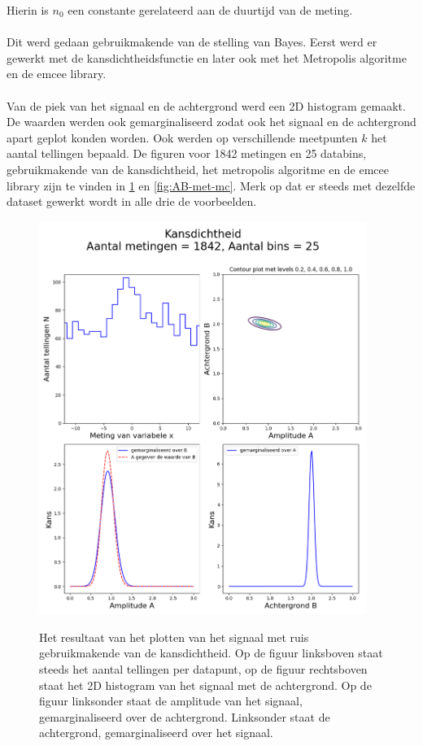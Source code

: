 Hierin is $n_{0}$ een constante gerelateerd aan de duurtijd van de meting. \\ \\
Dit werd gedaan gebruikmakende van de stelling van Bayes. Eerst werd er gewerkt met de kansdichtheidsfunctie en later ook met het Metropolis algoritme en de emcee library. \\ \\Van de piek van het signaal en de achtergrond werd een 2D histogram gemaakt. De waarden werden ook gemarginaliseerd zodat ook het signaal en de achtergrond apart geplot konden worden. Ook werden op verschillende meetpunten $k$ het aantal tellingen bepaald. De figuren voor 1842 metingen en 25 databins, gebruikmakende van de kansdichtheid, het metropolis algoritme en de emcee library zijn te vinden in \cref{fig:AB-bay} en \cref{fig:AB-met-mc}. Merk op dat er steeds met dezelfde dataset gewerkt wordt in alle drie de voorbeelden.
\begin{figure}
    \begin{minipage}{0.95\linewidth}
        \centering
        \includegraphics[width=0.95\textwidth]{Figures/figurenset1.png}
        \label{fig:AB-bayes}
    \end{minipage}
\caption{Het resultaat van het plotten van het signaal met ruis gebruikmakende van de kansdichtheid. Op de figuur linksboven staat steeds het aantal tellingen per datapunt, op de figuur rechtsboven staat het 2D histogram van het signaal met de achtergrond. Op de figuur linksonder staat de amplitude van het signaal, gemarginaliseerd over de achtergrond. Linksonder staat de achtergrond, gemarginaliseerd over het signaal.}
\label{fig:AB-bay}
\end{figure}
